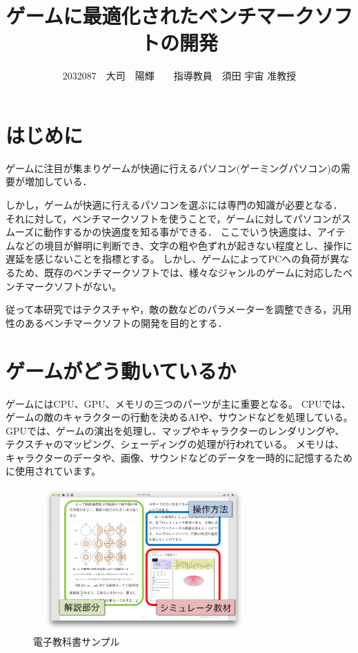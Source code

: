 \documentclass[twocolumn,10pt,a4j]{ltjsarticle}
\title{ゲームに最適化されたベンチマークソフトの開発}
\author{2032087　大司　陽輝　　指導教員　須田 宇宙 准教授}
\date{}
\begin{document}
\maketitle

\section{はじめに}
ゲームに注目が集まりゲームが快適に行えるパソコン(ゲーミングパソコン)の需要が増加している．


しかし，ゲームが快適に行えるパソコンを選ぶには専門の知識が必要となる．
それに対して，ベンチマークソフトを使うことで，ゲームに対してパソコンがスムーズに動作するかの快適度を知る事ができる．
ここでいう快適度は、アイテムなどの境目が鮮明に判断でき、文字の粗や色ずれが起きない程度とし、操作に遅延を感じないことを指標とする。
しかし、ゲームによってPCへの負荷が異なるため、既存のベンチマークソフトでは、様々なジャンルのゲームに対応したベンチマークソフトがない。

従って本研究ではテクスチャや，敵の数などのパラメーターを調整できる，汎用性のあるベンチマークソフトの開発を目的とする．


\section{ゲームがどう動いているか}
ゲームにはCPU、GPU、メモリの三つのパーツが主に重要となる。
CPUでは、ゲームの敵のキャラクターの行動を決めるAIや、サウンドなどを処理している。
GPUでは、ゲームの演出を処理し、マップやキャラクターのレンダリングや、テクスチャのマッピング、シェーディングの処理が行われている。
メモリは、キャラクターのデータや、画像、サウンドなどのデータを一時的に記憶するために使用されています。


\begin{figure}[h]
\begin{center}
 \includegraphics[clip,width=85mm,height=55mm]{textbook.pdf}
\end{center}
 \caption{電子教科書サンプル}
 \label{fig:教科書}
\end{figure}
\end{document}
